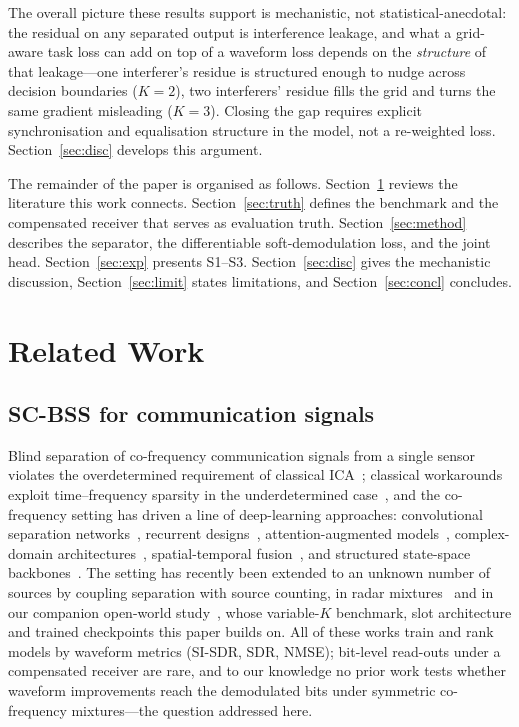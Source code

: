 \documentclass[review,12pt]{elsarticle}
\begin{document}
The overall picture these results support is mechanistic, not
statistical-anecdotal: the residual on any separated output is
interference leakage, and what a grid-aware task loss can add on top of
a waveform loss depends on the \emph{structure} of that leakage---one
interferer's residue is structured enough to nudge across decision
boundaries ($K{=}2$), two interferers' residue fills the grid and turns
the same gradient misleading ($K{=}3$). Closing the gap requires
explicit synchronisation and equalisation structure in the model, not a
re-weighted loss. Section~\ref{sec:disc} develops this argument.

The remainder of the paper is organised as follows.
Section~\ref{sec:related} reviews the literature this work connects.
Section~\ref{sec:truth} defines the benchmark and the compensated
receiver that serves as evaluation truth. Section~\ref{sec:method}
describes the separator, the differentiable soft-demodulation loss, and
the joint head. Section~\ref{sec:exp} presents S1--S3.
Section~\ref{sec:disc} gives the mechanistic discussion,
Section~\ref{sec:limit} states limitations, and
Section~\ref{sec:concl} concludes.

\section{Related Work}
\label{sec:related}

\subsection{SC-BSS for communication signals}

Blind separation of co-frequency communication signals from a single
sensor violates the overdetermined requirement of classical
ICA~\cite{hyvarinen2000ica}; classical workarounds exploit
time--frequency sparsity in the underdetermined
case~\cite{su2017underdetermined}, and the co-frequency setting
has driven a line of deep-learning
approaches: convolutional separation networks~\cite{hou2022single},
recurrent designs~\cite{chen2019deep}, attention-augmented
models~\cite{ma2023novel}, complex-domain
architectures~\cite{guo2024single}, spatial-temporal
fusion~\cite{luo2023single}, and structured state-space
backbones~\cite{s4unet2026}. The setting has recently been extended to
an unknown number of sources by coupling separation with source
counting, in radar mixtures~\cite{edsnet2026} and in our companion
open-world study~\cite{nong2026openworld}, whose variable-$K$ benchmark,
slot architecture and trained checkpoints this paper builds on. All of
these works train and rank models by waveform metrics (SI-SDR, SDR,
NMSE); bit-level read-outs under a compensated receiver are rare, and to
our knowledge no prior work tests whether waveform improvements reach
the demodulated bits under symmetric co-frequency mixtures---the
question addressed here.
\end{document}
